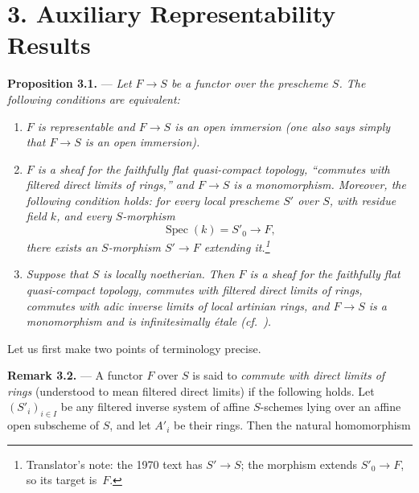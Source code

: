 
\section*{3. Auxiliary Representability
Results}

\medskip
\noindent{}\textbf{Proposition 3.1.} ---
\textit{Let \(F\to S\) be a functor over the prescheme \(S\).  The
following conditions are equivalent:}

\begin{enumerate}
\item[(i)] 
\textit{\(F\) is representable and \(F\to S\) is an open immersion
(one also says simply that \(F\to S\) is an open immersion).}

\item[(ii)] 
\textit{\(F\) is a sheaf for the faithfully flat quasi-compact
topology, ``commutes with filtered direct limits of rings,'' and
\(F\to S\) is a monomorphism.  Moreover, the following condition
holds: for every local prescheme \(S'\) over \(S\), with residue field
\(k\), and every \(S\)-morphism
\[
  \operatorname{Spec}(k)=S'_0\longrightarrow F,
\]
there exists an \(S\)-morphism \(S'\to F\) extending it.\footnote{Translator's note: the 1970 text has \(S'\to S\); the
morphism extends \(S'_0\to F\), so its target is~\(F\).}}

\item[(iii)] 
\textit{Suppose that \(S\) is locally noetherian.  Then \(F\) is a
sheaf for the faithfully flat quasi-compact topology, commutes with
filtered direct limits of rings, commutes with adic inverse limits of
local artinian rings, and \(F\to S\) is a monomorphism and is
infinitesimally étale
(cf.\ ).}
\end{enumerate}

Let us first make two points of terminology precise.

\medskip
\noindent{}\textbf{Remark 3.2.} ---
A functor \(F\) over \(S\) is said to \emph{commute with
direct limits of rings} (understood to mean filtered direct limits) if
the following holds.  Let \((S'_i)_{i\in I}\) be any filtered inverse
system of affine \(S\)-schemes lying over an affine open subscheme of
\(S\), and let \(A'_i\) be their rings.  Then the natural homomorphism

